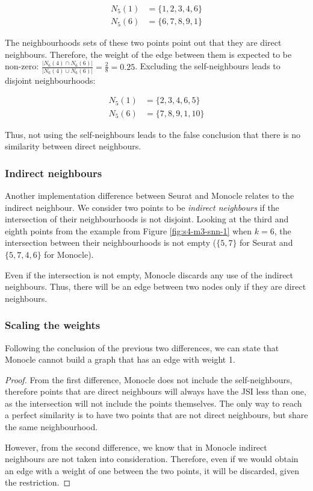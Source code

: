 \[ \begin{aligned}
        N_5(1) & = \{1,2,3,4,6\} \\
        N_5(6) & = \{6,7,8,9,1\}
    \end{aligned}
\]

The neighbourhoods sets of these two points point out that they are direct neighbours. Therefore, the weight of the edge between them is expected to be non-zero: $\displaystyle \frac{|N_6(4)  \cap N_6(6)|}{|N_6(4)  \cup N_6(6)|} = \frac{2}{8} = 0.25$. Excluding the self-neighbours leads to disjoint neighbourhoods:

\[ \begin{aligned}
        N_5(1) & = \{2,3,4,6,5\}  \\
        N_5(6) & = \{7,8,9,1,10\}
    \end{aligned}
\]

Thus, not using the self-neighbours leads to the false conclusion that there is no similarity between direct neighbours.

\subsubsection{Indirect neighbours}
Another implementation difference between Seurat and Monocle relates to the indirect neighbour. We consider two points to be \textit{indirect neighbours} if the intersection of their neighbourhoods is not disjoint. Looking at the third and eighth points from the example from Figure \ref{fig:s4-m3-snn-1} when $k = 6$, the intersection between their neighbourhoods is not empty ($\{5, 7\}$ for Seurat and $\{5,7,4,6\}$ for Monocle).

Even if the intersection is not empty, Monocle discards any use of the indirect neighbours. Thus, there will be an edge between two nodes only if they are direct neighbours.

\subsubsection{Scaling the weights}
Following the conclusion of the previous two differences, we can state that Monocle cannot build a graph that has an edge with weight 1.

\begin{proof} From the first difference, Monocle does not include the self-neighbours, therefore points that are direct neighbours will always have the JSI less than one, as the intersection will not include the points themselves. The only way to reach a perfect similarity is to have two points that are not direct neighbours, but share the same neighbourhood.

    However, from the second difference, we know that in Monocle indirect neighbours are not taken into consideration. Therefore, even if we would obtain an edge with a weight of one between the two points, it will be discarded, given the restriction.
\end{proof}


